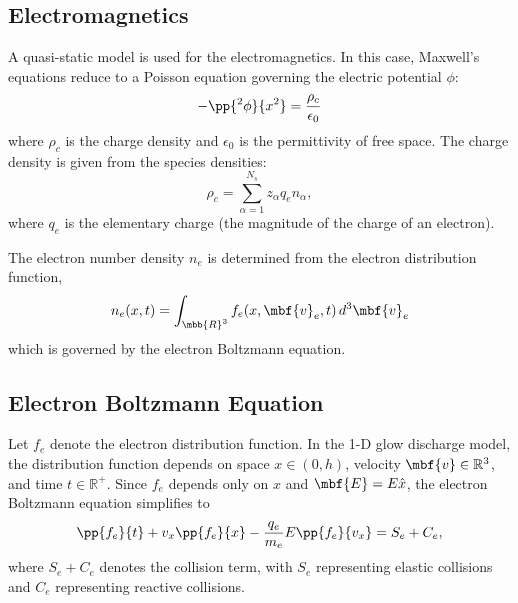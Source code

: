 \subsection{Electromagnetics} \label{sec:hybrid-poisson}
A quasi-static model is used for the electromagnetics.  In this case,
Maxwell's equations reduce to a Poisson equation governing the
electric potential $\phi$:
%
\begin{equation*}
-\pp{^2 \phi}{x^2} = \frac{\rho_c}{\epsilon_0}
\end{equation*}
%
where $\rho_c$ is the charge density and $\epsilon_0$ is the
permittivity of free space.  The charge density is given from the
species densities:
%
\begin{equation*}
\rho_c = \sum_{\alpha=1}^{N_s} z_{\alpha} q_e n_{\alpha},
\end{equation*}
%
where $q_e$ is the elementary charge (the magnitude of the charge of
an electron).

The electron number density $n_e$ is determined from the electron
distribution function,
%
\begin{equation*}
n_e(x,t) = \int_{\mbb{R}^3} f_e(x, \mbf{v}_e, t) \, d^3 \mbf{v}_e
\end{equation*}
%
which is governed by the electron Boltzmann equation.

\subsection{Electron Boltzmann Equation} \label{sec:hybrid-ebolt}
Let $f_e$ denote the electron distribution function.  In the 1-D glow
discharge model, the distribution function depends on space $x \in
(0,h)$, velocity $\mbf{v} \in \mathbb{R}^3$, and time $t \in
\mathbb{R}^+$.  Since $f_e$ depends only on $x$ and $\mbf{E} = E
\hat{x}$, the electron Boltzmann equation simplifies to
%
\begin{equation*}
\pp{f_e}{t} + v_x \pp{f_e}{x} - \frac{q_e}{m_e} E \pp{f_e}{v_x} = S_e + C_e,
\end{equation*}
%
where $S_e+C_e$ denotes the collision term, with $S_e$ representing elastic
collisions and $C_e$ representing reactive collisions.

